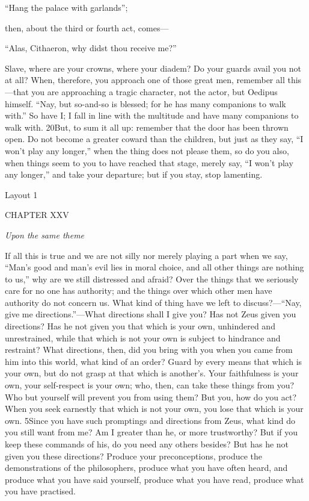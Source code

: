 ``Hang the palace with garlands'';

then, about the third or fourth act, comes—

``Alas, Cithaeron, why didst thou receive me?''

Slave, where are your crowns, where your diadem? Do your guards avail you not at all? When, therefore, you approach one of those great men, remember all this—that you are approaching a tragic character, not the actor, but Oedipus himself. ``Nay, but so-and-so is blessed; for he has many companions to walk with.'' So have I; I fall in line with the multitude and have many companions to walk with. 20But, to sum it all up: remember that the door has been thrown open. Do not become a greater coward than the children, but just as they say, ``I won't play any longer,'' when the thing does not please them, so do you also, when things seem to you to have reached that stage, merely say, ``I won't play any longer,'' and take your departure; but if you stay, stop lamenting.



Layout 1

CHAPTER XXV

\emph{Upon the same theme}

If all this is true and we are not silly nor merely playing a part when we say, ``Man's good and man's evil lies in moral choice, and all other things are nothing to us,'' why are we still distressed and afraid? Over the things that we seriously care for no one has authority; and the things over which other men have authority do not concern us. What kind of thing have we left to discuss?—``Nay, give me directions.''—What directions shall I give you? Has not Zeus given you directions? Has he not given you that which is your own, unhindered and unrestrained, while that which is not your own is subject to hindrance and restraint? What directions, then, did you bring with you when you came from him into this world, what kind of an order? Guard by every means that which is your own, but do not grasp at that which is another's. Your faithfulness is your own, your self-respect is your own; who, then, can take these things from you? Who but yourself will prevent you from using them? But you, how do you act? When you seek earnestly that which is not your own, you lose that which is your own. 5Since you have such promptings and directions from Zeus, what kind do you still want from me? Am I greater than he, or more trustworthy? But if you keep these commands of his, do you need any others besides? But has he not given you these directions? Produce your preconceptions, produce the demonstrations of the philosophers, produce what you have often heard, and produce what you have said yourself, produce what you have read, produce what you have practised.

